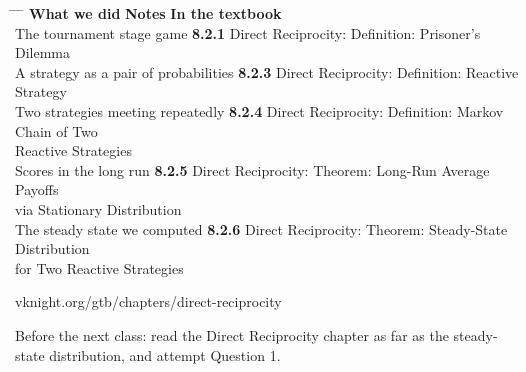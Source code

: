 \hspace{0.3cm}
\begin{minipage}{0.95\linewidth}
\begin{tabbing}
\hspace{6.9cm} \= \hspace{3.0cm} \= \hspace{9.4cm} \= \kill
\textbf{What we did} \> {\color{inkteal}\textbf{Notes}} \> \textbf{In the textbook} \>
  \\[0.5em]
The tournament stage game \> {\color{inkteal}\textbf{8.2.1}} \> Direct Reciprocity:
  Definition: Prisoner's Dilemma \> \\[0.45em]
A strategy as a pair of probabilities \> {\color{inkteal}\textbf{8.2.3}} \> Direct
  Reciprocity: Definition: Reactive Strategy \> \\[0.45em]
Two strategies meeting repeatedly \> {\color{inkteal}\textbf{8.2.4}} \> Direct
  Reciprocity: Definition: Markov Chain of Two \> \\
\> \> Reactive Strategies \> \\[0.45em]
Scores in the long run \> {\color{inkteal}\textbf{8.2.5}} \> Direct Reciprocity:
  Theorem: Long-Run Average Payoffs \> \\
\> \> via Stationary Distribution \> \\[0.45em]
The steady state we computed \> {\color{inkteal}\textbf{8.2.6}} \> Direct Reciprocity:
  Theorem: Steady-State Distribution \> \\
\> \> for Two Reactive Strategies \> 
\end{tabbing}
\end{minipage}

\vspace{0.45cm}

{\color{inkgrey} vknight.org/gtb/chapters/direct-reciprocity}

\vspace{0.3cm}

{\large Before the next class: read the Direct Reciprocity chapter as far as the
  steady-state
  distribution, and attempt Question 1.}


